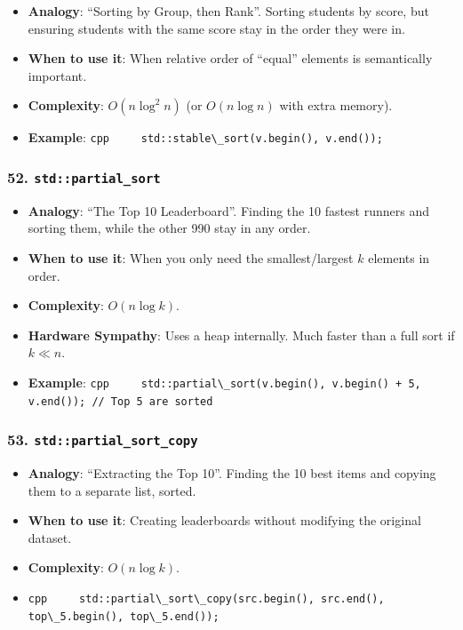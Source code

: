 \begin{itemize}
\tightlist
\item
  \textbf{Analogy}: ``Sorting by Group, then Rank''. Sorting students by
  score, but ensuring students with the same score stay in the order
  they were in.
\item
  \textbf{When to use it}: When relative order of ``equal'' elements is
  semantically important.
\item
  \textbf{Complexity}: \(O(n \log^2 n)\) (or \(O(n \log n)\) with extra
  memory).
\item
  \textbf{Example}:
  \passthrough{\lstinline!cpp     std::stable\_sort(v.begin(), v.end());!}
\end{itemize}

\hypertarget{stdpartial_sort}{%
\subsubsection{\texorpdfstring{52.
\texttt{std::partial\_sort}}{52. std::partial\_sort}}\label{stdpartial_sort}}

\begin{itemize}
\tightlist
\item
  \textbf{Analogy}: ``The Top 10 Leaderboard''. Finding the 10 fastest
  runners and sorting them, while the other 990 stay in any order.
\item
  \textbf{When to use it}: When you only need the smallest/largest \(k\)
  elements in order.
\item
  \textbf{Complexity}: \(O(n \log k)\).
\item
  \textbf{Hardware Sympathy}: Uses a heap internally. Much faster than a
  full sort if \(k \ll n\).
\item
  \textbf{Example}:
  \passthrough{\lstinline!cpp     std::partial\_sort(v.begin(), v.begin() + 5, v.end()); // Top 5 are sorted!}
\end{itemize}

\hypertarget{stdpartial_sort_copy}{%
\subsubsection{\texorpdfstring{53.
\texttt{std::partial\_sort\_copy}}{53. std::partial\_sort\_copy}}\label{stdpartial_sort_copy}}

\begin{itemize}
\tightlist
\item
  \textbf{Analogy}: ``Extracting the Top 10''. Finding the 10 best items
  and copying them to a separate list, sorted.
\item
  \textbf{When to use it}: Creating leaderboards without modifying the
  original dataset.
\item
  \textbf{Complexity}: \(O(n \log k)\).
\item
  \passthrough{\lstinline!cpp     std::partial\_sort\_copy(src.begin(), src.end(), top\_5.begin(), top\_5.end());!}
\end{itemize}


